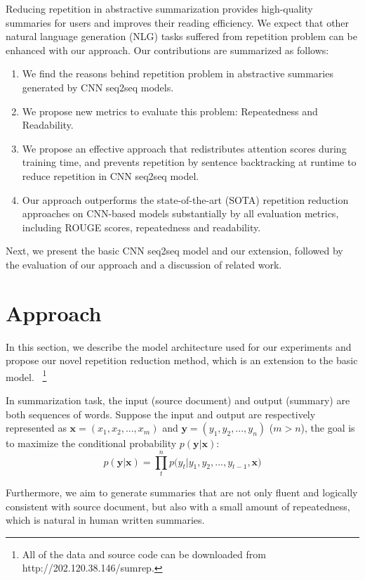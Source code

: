 \documentclass{nle}
\theoremstyle{definition}
\newcommand{\tabref}[1]{Table \ref{#1}}
\begin{document}
Reducing repetition in abstractive summarization provides high-quality summaries for users and improves their reading efficiency.
We expect that other natural language generation (NLG) tasks suffered from repetition problem can be enhanced with our approach. 
Our contributions are summarized as follows:
\begin{enumerate}
	\item We find the reasons behind repetition problem in abstractive summaries generated
	by CNN seq2seq models.
	\item We propose new metrics to evaluate this problem: Repeatedness and Readability.
	\item We propose an effective approach that redistributes attention scores 
	during training time, and prevents repetition by sentence backtracking
	at runtime to reduce repetition in CNN seq2seq model.
	\item Our approach
	outperforms the state-of-the-art (SOTA) repetition reduction approaches on CNN-based models
	substantially by all evaluation metrics, including ROUGE scores, 
	repeatedness and readability.
\end{enumerate}

Next, we present the basic CNN seq2seq model and our extension, 
followed by the evaluation of our approach and a discussion of related work.

\section{Approach}
\label{sec:approach}

In this section, we describe the model architecture used for our experiments
and propose our novel repetition reduction method, which is an extension to the basic model.
~\footnote{
	All of the data and source code
	can be downloaded from http://202.120.38.146/sumrep.}

In summarization task, the input (source document) and
output (summary) are both sequences of words.
Suppose the input and output are respectively represented as
$\textbf{x} = (x_{1},x_{2},...,x_{m})$ and 
$\textbf{y} = (y_{1}, y_{2},..., y_{n})$ ($m>n$),
the goal is to maximize the conditional probability
$p(\textbf{y}|\textbf{x})$:
\begin{equation}
	p(\textbf{y} | \textbf{x}) \!=\! {\prod^n_{t} {p(y_{t} | y_{1}, y_{2},..., y_{t-1}, \textbf{x}})}
\end{equation}

Furthermore, we aim to generate summaries that are not only fluent 
and logically consistent with source document, but also with 
a small amount of repeatedness, which is natural in human written summaries.  
\end{document}
